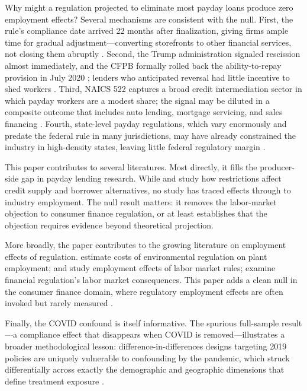\documentclass[12pt]{article}
\begin{document}
Why might a regulation projected to eliminate most payday loans produce zero employment effects? Several mechanisms are consistent with the null. First, the rule's compliance date arrived 22 months after finalization, giving firms ample time for gradual adjustment---converting storefronts to other financial services, not closing them abruptly \citep{stegman2007}. Second, the Trump administration signaled rescission almost immediately, and the CFPB formally rolled back the ability-to-repay provision in July 2020 \citep{cfpb2020}; lenders who anticipated reversal had little incentive to shed workers \citep{jackson2014}. Third, NAICS 522 captures a broad credit intermediation sector in which payday workers are a modest share; the signal may be diluted in a composite outcome that includes auto lending, mortgage servicing, and sales financing \citep{bhutta2015}. Fourth, state-level payday regulations, which vary enormously and predate the federal rule in many jurisdictions, may have already constrained the industry in high-density states, leaving little federal regulatory margin \citep{avery2011, graves2003}.

This paper contributes to several literatures. Most directly, it fills the producer-side gap in payday lending research. While \citet{morgan2012} and \citet{desai2017} study how restrictions affect credit supply and borrower alternatives, no study has traced effects through to industry employment. The null result matters: it removes the labor-market objection to consumer finance regulation, or at least establishes that the objection requires evidence beyond theoretical projection.

More broadly, the paper contributes to the growing literature on employment effects of regulation. \citet{greenstone2012} estimate costs of environmental regulation on plant employment; \citet{autor2007} and \citet{meer2016} study employment effects of labor market rules; \citet{demirguckunt2004} examine financial regulation's labor market consequences. This paper adds a clean null in the consumer finance domain, where regulatory employment effects are often invoked but rarely measured \citep{jackson2014}.

Finally, the COVID confound is itself informative. The spurious full-sample result---a compliance effect that disappears when COVID is removed---illustrates a broader methodological lesson: difference-in-differences designs targeting 2019 policies are uniquely vulnerable to confounding by the pandemic, which struck differentially across exactly the demographic and geographic dimensions that define treatment exposure \citep{chetty2020}.
\end{document}
